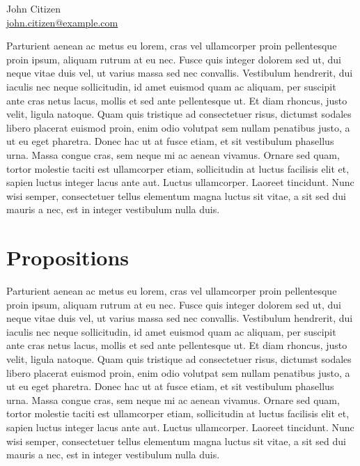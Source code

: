 \documentclass[10pt,a4paper,oneside]{alb-latex}
\begin{document}
%
%
%


\begin{albTitlePage}


  John Citizen\\
  \url{john.citizen@example.com}



  Parturient aenean ac metus eu lorem, cras vel ullamcorper proin
  pellentesque proin ipsum, aliquam rutrum at eu nec. Fusce quis integer
  dolorem sed ut, dui neque vitae duis vel, ut varius massa sed nec
  convallis. Vestibulum hendrerit, dui iaculis nec neque sollicitudin,
  id amet euismod quam ac aliquam, per suscipit ante cras netus lacus,
  mollis et sed ante pellentesque ut. Et diam rhoncus, justo velit,
  ligula natoque. Quam quis tristique ad consectetuer risus, dictumst
  sodales libero placerat euismod proin, enim odio volutpat sem nullam
  penatibus justo, a ut eu eget pharetra. Donec hac ut at fusce etiam,
  et sit vestibulum phasellus urna. Massa congue cras, sem neque mi ac
  aenean vivamus. Ornare sed quam, tortor molestie taciti est
  ullamcorper etiam, sollicitudin at luctus facilisis elit et, sapien
  luctus integer lacus ante aut. Luctus ullamcorper. Laoreet
  tincidunt. Nunc wisi semper, consectetuer tellus elementum magna
  luctus sit vitae, a sit sed dui mauris a nec, est in integer
  vestibulum nulla duis.

\end{albTitlePage}

%
%
%

\section{Propositions}
\label{sec:alb-latex-article:prop}

Parturient aenean ac metus eu lorem, cras vel ullamcorper proin
pellentesque proin ipsum, aliquam rutrum at eu nec. Fusce quis integer
dolorem sed ut, dui neque vitae duis vel, ut varius massa sed nec
convallis. Vestibulum hendrerit, dui iaculis nec neque sollicitudin, id
amet euismod quam ac aliquam, per suscipit ante cras netus lacus, mollis
et sed ante pellentesque ut. Et diam rhoncus, justo velit, ligula
natoque. Quam quis tristique ad consectetuer risus, dictumst sodales
libero placerat euismod proin, enim odio volutpat sem nullam penatibus
justo, a ut eu eget pharetra. Donec hac ut at fusce etiam, et sit
vestibulum phasellus urna. Massa congue cras, sem neque mi ac aenean
vivamus. Ornare sed quam, tortor molestie taciti est ullamcorper etiam,
sollicitudin at luctus facilisis elit et, sapien luctus integer lacus
ante aut. Luctus ullamcorper. Laoreet tincidunt. Nunc wisi semper,
consectetuer tellus elementum magna luctus sit vitae, a sit sed dui
mauris a nec, est in integer vestibulum nulla duis.
\end{document}
